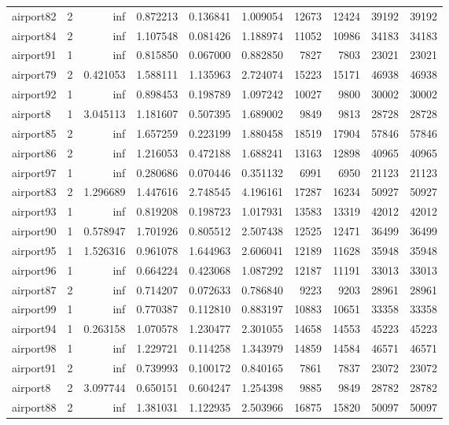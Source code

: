 \begin{longtable}{|l|r|r|r|r|r|r|r|r|r|}
airport82 & 2 & inf & 0.872213 & 0.136841 & 1.009054 & 12673 & 12424 & 39192 & 39192 \\
airport84 & 2 & inf & 1.107548 & 0.081426 & 1.188974 & 11052 & 10986 & 34183 & 34183 \\
airport91 & 1 & inf & 0.815850 & 0.067000 & 0.882850 & 7827 & 7803 & 23021 & 23021 \\
airport79 & 2 & 0.421053 & 1.588111 & 1.135963 & 2.724074 & 15223 & 15171 & 46938 & 46938 \\
airport92 & 1 & inf & 0.898453 & 0.198789 & 1.097242 & 10027 & 9800 & 30002 & 30002 \\
airport8 & 1 & 3.045113 & 1.181607 & 0.507395 & 1.689002 & 9849 & 9813 & 28728 & 28728 \\
airport85 & 2 & inf & 1.657259 & 0.223199 & 1.880458 & 18519 & 17904 & 57846 & 57846 \\
airport86 & 2 & inf & 1.216053 & 0.472188 & 1.688241 & 13163 & 12898 & 40965 & 40965 \\
airport97 & 1 & inf & 0.280686 & 0.070446 & 0.351132 & 6991 & 6950 & 21123 & 21123 \\
airport83 & 2 & 1.296689 & 1.447616 & 2.748545 & 4.196161 & 17287 & 16234 & 50927 & 50927 \\
airport93 & 1 & inf & 0.819208 & 0.198723 & 1.017931 & 13583 & 13319 & 42012 & 42012 \\
airport90 & 1 & 0.578947 & 1.701926 & 0.805512 & 2.507438 & 12525 & 12471 & 36499 & 36499 \\
airport95 & 1 & 1.526316 & 0.961078 & 1.644963 & 2.606041 & 12189 & 11628 & 35948 & 35948 \\
airport96 & 1 & inf & 0.664224 & 0.423068 & 1.087292 & 12187 & 11191 & 33013 & 33013 \\
airport87 & 2 & inf & 0.714207 & 0.072633 & 0.786840 & 9223 & 9203 & 28961 & 28961 \\
airport99 & 1 & inf & 0.770387 & 0.112810 & 0.883197 & 10883 & 10651 & 33358 & 33358 \\
airport94 & 1 & 0.263158 & 1.070578 & 1.230477 & 2.301055 & 14658 & 14553 & 45223 & 45223 \\
airport98 & 1 & inf & 1.229721 & 0.114258 & 1.343979 & 14859 & 14584 & 46571 & 46571 \\
airport91 & 2 & inf & 0.739993 & 0.100172 & 0.840165 & 7861 & 7837 & 23072 & 23072 \\
airport8 & 2 & 3.097744 & 0.650151 & 0.604247 & 1.254398 & 9885 & 9849 & 28782 & 28782 \\
airport88 & 2 & inf & 1.381031 & 1.122935 & 2.503966 & 16875 & 15820 & 50097 & 50097 \\

\end{longtable}
